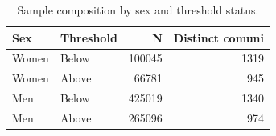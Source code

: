 \begin{table}[htbp]
\centering
\begin{tabular}{llrr}
\toprule
Sex & Threshold & N & Distinct comuni \\
\midrule
Women & Below & 100045 & 1319 \\
Women & Above & 66781 & 945 \\
Men & Below & 425019 & 1340 \\
Men & Above & 265096 & 974 \\
\bottomrule
\end{tabular}

\caption{Sample composition by sex and threshold status.}
\label{tab:descriptive_composition}
\end{table}
